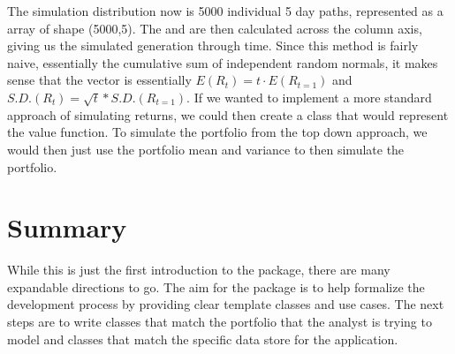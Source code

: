\documentclass[letterpaper,10pt,english]{sphinxmanual}
\begin{document}
\sphinxAtStartPar
The simulation distribution now is 5000 individual 5 day paths,
represented as a  array of shape (5000,5). The
 and  are then calculated across
the column axis, giving us the simulated generation through time. Since
this method is fairly naive, essentially the cumulative sum of
independent random normals, it makes sense that the 
vector is essentially \(E(R_{t}) = t \cdot E(R_{t=1})\) and
\(S.D.(R_{t}) = \sqrt{t} * S.D.(R_{t=1})\). If we wanted to
implement a more standard approach of simulating returns, we could then
create a  class that would represent the value function.
To simulate the portfolio from the top down approach, we would then just
use the portfolio mean and variance to then simulate the portfolio.


\section{Summary}
\label{\detokenize{gettingstarted:summary}}
\sphinxAtStartPar
While this is just the first introduction to the package, there are many
expandable directions to go. The aim for the package is to help
formalize the development process by providing clear template classes
and use cases. The next steps are to write  classes that
match the portfolio that the analyst is trying to model and
 classes that match the specific data store for the
application.
\end{document}
